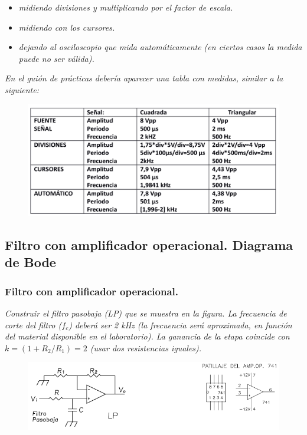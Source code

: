 \documentclass[paper=a4, fontsize=11pt]{scrartcl} %
\numberwithin{equation}{section} %
\numberwithin{figure}{section} %
\numberwithin{table}{section} %
\begin{document}
\begin{itemize}
	\item \textit{midiendo divisiones y multiplicando por el factor de escala.}
	\item \textit{midiendo con los cursores.}
	\item \textit{dejando al osciloscopio que mida automáticamente (en ciertos casos la medida puede no ser válida).}
\end{itemize}

\textit{En el guión de prácticas debería aparecer una tabla con medidas, similar a la siguiente:} \newline

\begin{figure}[H]
\centering
\includegraphics[width=1\linewidth]{image/tablavictor2}
\label{fig:tablavictor2}
\end{figure}


 \newpage

\subsection{Filtro con amplificador operacional. Diagrama de Bode}

\subsubsection{Filtro con amplificador operacional. \cite{IA}}
\textit{Construir el filtro pasobaja (LP) que se muestra en la figura. La frecuencia de corte del filtro ($ f_{c} $)  deberá ser 2 kHz (la frecuencia será aproximada, en función del material disponible en el laboratorio). La ganancia de la etapa coincide con $ k=(1+R_{2}/R_{1})=2 $ (usar dos resistencias iguales).}

\begin{figure}[H]
	\centering
	\includegraphics[scale=1]{image/filtro-baja}
\end{figure}
\end{document}
